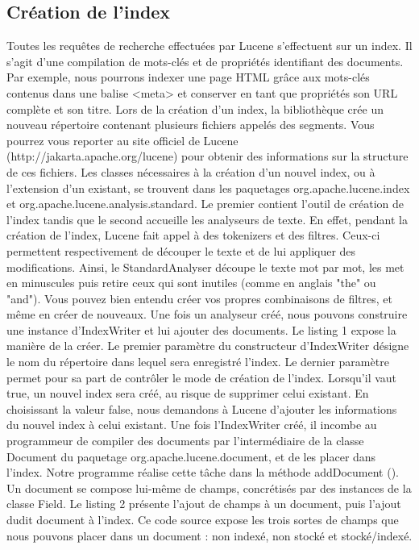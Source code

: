 \documentclass[12pt]{report}
\begin{document}
\subsection{Création de l'index}
Toutes les requêtes de recherche effectuées par Lucene s'effectuent sur un index. Il s'agit d'une compilation de mots-clés et de propriétés identifiant des documents. Par exemple, nous pourrons indexer une page HTML grâce aux mots-clés	contenus dans une balise <meta> et conserver en tant que propriétés son URL complète et son titre. 
Lors de la création d'un index, la bibliothèque crée un nouveau répertoire contenant plusieurs fichiers appelés des segments. Vous pourrez vous reporter au site officiel de Lucene (http://jakarta.apache.org/lucene) pour obtenir des informations sur la structure de ces fichiers. 
Les classes nécessaires à la création d'un nouvel index, ou à l'extension d'un existant, se trouvent dans les paquetages org.apache.lucene.index et org.apache.lucene.analysis.standard. Le premier contient l'outil de création de l'index tandis que le second accueille les analyseurs de texte. En effet, pendant la création de l'index, Lucene fait appel à des tokenizers et des filtres. Ceux-ci permettent respectivement de découper le texte et de lui appliquer des modifications. Ainsi, le StandardAnalyser découpe le texte mot par mot, les met en minuscules puis retire ceux qui sont inutiles (comme en anglais "the" ou "and"). Vous pouvez bien entendu créer vos propres combinaisons de filtres, et même en créer de nouveaux. 
Une fois un analyseur créé, nous pouvons construire une instance d'IndexWriter et lui ajouter des documents. Le listing 1 expose la manière de la créer. 
Le premier paramètre du constructeur d'IndexWriter désigne le nom du répertoire dans lequel sera enregistré l'index. Le dernier paramètre permet pour sa part de contrôler le mode de création de l'index. Lorsqu'il vaut true, un nouvel index sera créé, au risque de supprimer celui existant. En choisissant la valeur false, nous demandons à Lucene d'ajouter les informations du nouvel index à celui existant. 
Une fois l'IndexWriter créé, il incombe au programmeur de compiler des documents par l'intermédiaire de la classe Document du paquetage org.apache.lucene.document, et de les placer dans l'index. Notre programme réalise cette tâche dans la méthode addDocument (). Un document se compose lui-même de champs, concrétisés par des instances de la classe Field. Le listing 2 présente l'ajout de champs à un document, puis l'ajout dudit document à l'index. Ce code source expose les trois sortes de champs que nous pouvons placer dans un document : non indexé, non stocké et stocké/indexé. 
\end{document}
